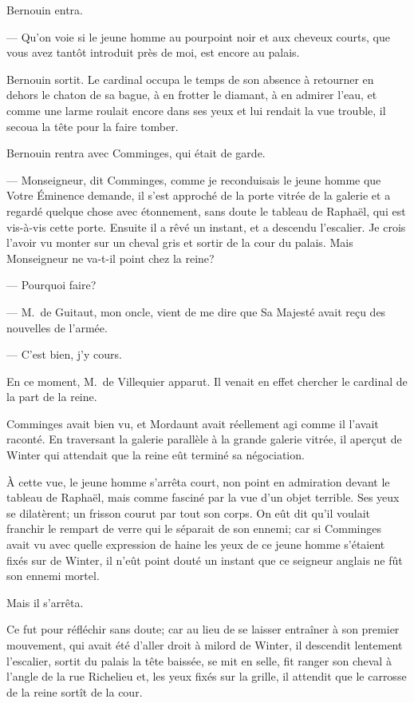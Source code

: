 Bernouin entra.

— Qu'on voie si le jeune homme au pourpoint noir et aux cheveux courts, que vous avez tantôt introduit près de moi, est encore au palais.

Bernouin sortit. Le cardinal occupa le temps de son absence à retourner en dehors le chaton de sa bague, à en frotter le diamant, à en admirer l'eau, et comme une larme roulait encore dans ses yeux et lui rendait la vue trouble, il secoua la tête pour la faire tomber.

Bernouin rentra avec Comminges, qui était de garde.

— Monseigneur, dit Comminges, comme je reconduisais le jeune homme que Votre Éminence demande, il s'est approché de la porte vitrée de la galerie et a regardé quelque chose avec étonnement, sans doute le tableau de Raphaël, qui est vis-à-vis cette porte. Ensuite il a rêvé un instant, et a descendu l'escalier. Je crois l'avoir vu monter sur un cheval gris et sortir de la cour du palais. Mais Monseigneur ne va-t-il point chez la reine?

— Pourquoi faire?

— M.~de Guitaut, mon oncle, vient de me dire que Sa Majesté avait reçu des nouvelles de l'armée.

— C'est bien, j'y cours.

En ce moment, M.~de Villequier apparut. Il venait en effet chercher le cardinal de la part de la reine.

Comminges avait bien vu, et Mordaunt avait réellement agi comme il l'avait raconté. En traversant la galerie parallèle à la grande galerie vitrée, il aperçut de Winter qui attendait que la reine eût terminé sa négociation.

À cette vue, le jeune homme s'arrêta court, non point en admiration devant le tableau de Raphaël, mais comme fasciné par la vue d'un objet terrible. Ses yeux se dilatèrent; un frisson courut par tout son corps. On eût dit qu'il voulait franchir le rempart de verre qui le séparait de son ennemi; car si Comminges avait vu avec quelle expression de haine les yeux de ce jeune homme s'étaient fixés sur de Winter, il n'eût point douté un instant que ce seigneur anglais ne fût son ennemi mortel.

Mais il s'arrêta.

Ce fut pour réfléchir sans doute; car au lieu de se laisser entraîner à son premier mouvement, qui avait été d'aller droit à milord de Winter, il descendit lentement l'escalier, sortit du palais la tête baissée, se mit en selle, fit ranger son cheval à l'angle de la rue Richelieu et, les yeux fixés sur la grille, il attendit que le carrosse de la reine sortît de la cour.

